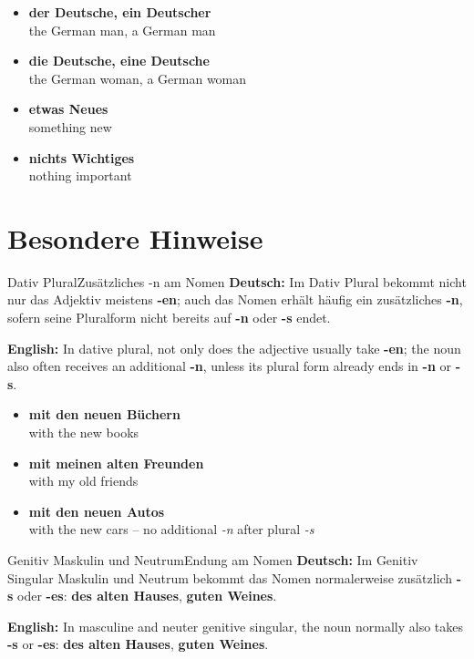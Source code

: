 \documentclass[a4paper,11pt]{article}
\newcommand{\GermanText}[1]{\textbf{Deutsch: }#1\par}
\newcommand{\EnglishText}[1]{{\small\color{SoftGray}\textbf{English: }#1\par}}
\newcommand{\ExampleItem}[2]{\item \textbf{#1}\\{\small\color{SoftGray}#2}}
\begin{document}
        \begin{exbox}
            \begin{itemize}
                \ExampleItem{der Deutsche, ein Deutscher}{the German man, a German man}
                \ExampleItem{die Deutsche, eine Deutsche}{the German woman, a German woman}
                \ExampleItem{etwas Neues}{something new}
                \ExampleItem{nichts Wichtiges}{nothing important}
            \end{itemize}
        \end{exbox}

    \section{Besondere Hinweise}

        \begin{grammarentry}{Dativ Plural}{Zusätzliches -n am Nomen}
            \GermanText{Im Dativ Plural bekommt nicht nur das Adjektiv meistens \textbf{-en}; auch das Nomen erhält häufig ein zusätzliches \textbf{-n}, sofern seine Pluralform nicht bereits auf \textbf{-n} oder \textbf{-s} endet.}
            \EnglishText{In dative plural, not only does the adjective usually take \textbf{-en}; the noun also often receives an additional \textbf{-n}, unless its plural form already ends in \textbf{-n} or \textbf{-s}.}
        \end{grammarentry}

        \begin{exbox}
            \begin{itemize}
                \ExampleItem{mit den neuen Büchern}{with the new books}
                \ExampleItem{mit meinen alten Freunden}{with my old friends}
                \ExampleItem{mit den neuen Autos}{with the new cars -- no additional \textit{-n} after plural \textit{-s}}
            \end{itemize}
        \end{exbox}

        \begin{grammarentry}{Genitiv Maskulin und Neutrum}{Endung am Nomen}
            \GermanText{Im Genitiv Singular Maskulin und Neutrum bekommt das Nomen normalerweise zusätzlich \textbf{-s} oder \textbf{-es}: \textbf{des alten Hauses}, \textbf{guten Weines}.}
            \EnglishText{In masculine and neuter genitive singular, the noun normally also takes \textbf{-s} or \textbf{-es}: \textbf{des alten Hauses}, \textbf{guten Weines}.}
        \end{grammarentry}
\end{document}
